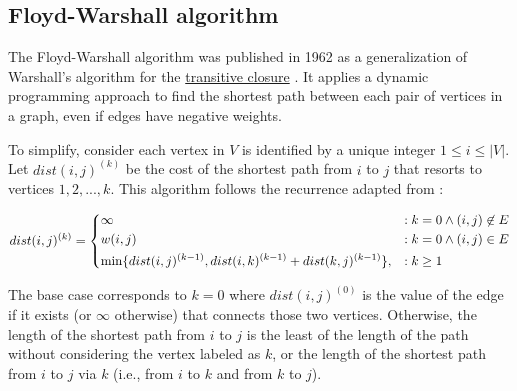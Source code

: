 \subsection{Floyd-Warshall algorithm} \label{algorithm-shortestpath-floydwarshall}
The Floyd-Warshall algorithm was published in 1962 as a generalization of Warshall's algorithm for the \hyperref[def:desc]{transitive closure} \cite[p.~346]{floyd-alg}. It applies a dynamic programming approach 
to find the shortest path between each pair of vertices in a graph, even if edges have negative weights.\par
To simplify, consider each vertex in $V$ is identified by a unique integer $1 \leq i \leq |V|$.
Let $dist(i, j)^{(k)}$ be the cost of the shortest path from $i$ to $j$ that resorts to vertices $1, 2, ..., k$.
This algorithm follows the recurrence adapted from \cite{intro-alg}:

\begin{equation}
    dist(i,j)^{(k)}=\begin{dcases}
        \infty                                                         &: k=0 \wedge (i,j) \not \in E \\
        w(i,j)                                                         &: k=0 \wedge (i,j) \in E\\
        \min\{dist(i,j)^{(k-1)}, dist(i,k)^{(k-1)} + dist(k,j)^{(k-1)}\}, &: k \geq 1
    \end{dcases}
\end{equation}

The base case corresponds to $k=0$ where $dist(i, j)^{(0)}$ is the value of the edge if it exists (or $\infty$ otherwise) that connects those two vertices.
Otherwise, the length of the shortest path from $i$ to $j$ is the least of the length of the path without considering the vertex labeled as $k$,
or the length of the shortest path from $i$ to $j$ via $k$ (i.e., from $i$ to $k$ and from $k$ to $j$).\par

